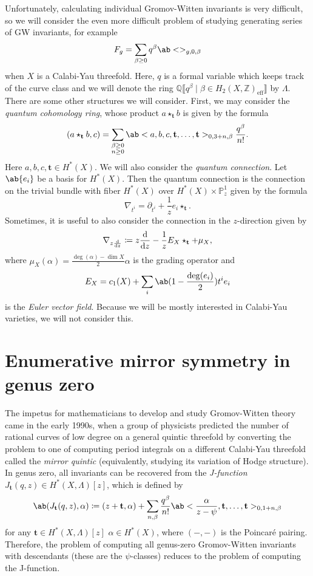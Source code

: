 \documentclass{amsart}
\theoremstyle{definition}
\theoremstyle{remark}
\theoremstyle{plain}
\theoremstyle{definition}
\theoremstyle{remark}
\newcommand{\Z}{\mathbb{Z}}
\newcommand{\Q}{\mathbb{Q}}
\renewcommand{\P}{\mathbb{P}}
\newcommand{\mbf}[1]{\mathbf{#1}}
\newcommand{\mr}[1]{\mathrm{#1}}
\newcommand{\1}{\mathbf{1}}
\newcommand{\2}{\mathbf{2}}
\newcommand{\3}{\mathbf{3}}
\newcommand{\ps}[1]{\llbracket #1 \rrbracket}
\begin{document}
Unfortunately, calculating individual Gromov-Witten invariants is very difficult, so we will consider the even more difficult problem of studying generating series of GW invariants, for example
\[ F_g = \sum_{\beta \geq 0} q^{\beta} \ab<>_{g,0,\beta} \]
when \(X\) is a Calabi-Yau threefold. Here, \(q\) is a formal variable which keeps track of the curve class and we will denote the ring \(\Q\ps{q^{\beta} \mid \beta \in H_2(X, \Z)_{\mr{eff}}}\) by \(\Lambda\). There are some other structures we will consider. First, we may consider the \textit{quantum cohomology ring}, whose product \(a \star_{\mbf{t}} b\) is given by the formula 
\[
    (a \star_{\mbf{t}} b, c) = \sum_{\substack{\beta \geq 0 \\ n \geq 0}} \ab<a,b,c, \mbf{t}, \ldots, \mbf{t}>_{0,3+n,\beta} \frac{q^{\beta}}{n!}.
\]
Here \(a,b,c, \mbf{t} \in H^*(X)\). We will also consider the \textit{quantum connection}. Let \(\ab\{ e_i \}\) be a basis for \(H^*(X)\). Then the quantum connection is the connection on the trivial bundle with fiber \(H^*(X)\) over \(H^*(X) \times \P^1_z\) given by the formula
\[ \nabla_{t^i} = \partial_{t^i} + \frac{1}{z} e_i \star_{\mbf{t}}. \]
Sometimes, it is useful to also consider the connection in the \(z\)-direction given by 
\[ \nabla_{z \odv{}{z}} \coloneqq z \odv{}{z} - \frac{1}{z} E_X \star_{\mbf{t}} + \mu_X, \]
where \(\mu_X(\alpha) = \frac{\deg(\alpha) - \dim X}{2} \alpha\) is the grading operator and
\[ E_X = c_1(X) + \sum_i \ab(1 - \frac{\deg(e_i)}{2})t^i e_i \]
is the \textit{Euler vector field}. Because we will be mostly interested in Calabi-Yau varieties, we will not consider this.

\section{Enumerative mirror symmetry in genus zero}%
\label{sec:Enumerative mirror symmetry in genus zero}

The impetus for mathematicians to develop and study Gromov-Witten theory came in the early 1990s, when a group of physicists predicted the number of rational curves of low degree on a general quintic threefold by converting the problem to one of computing period integrals on a different Calabi-Yau threefold called the \textit{mirror quintic} (equivalently, studying its variation of Hodge structure). In genus zero, all invariants can be recovered from the \textit{J-function} \(J_{\mbf{t}}(q,z) \in H^*(X, \Lambda)[z]\), which is defined by
\[ \ab( J_{\mbf{t}}(q, z), \alpha ) \coloneqq (z + \mbf{t}, \alpha) + \sum_{n, \beta} \frac{q^{\beta}}{n!} \ab< \frac{\alpha}{z-\psi}, \mbf{t}, \ldots, \mbf{t}>_{0,1+n, \beta} \]
for any \(\mbf{t} \in H^*(X, \Lambda)[z]\)  \(\alpha \in H^*(X)\), where \((-,-)\) is the Poincar\'e pairing. Therefore, the problem of computing all genus-zero Gromov-Witten invariants with descendants (these are the \(\psi\)-classes) reduces to the problem of computing the J-function.
\end{document}
